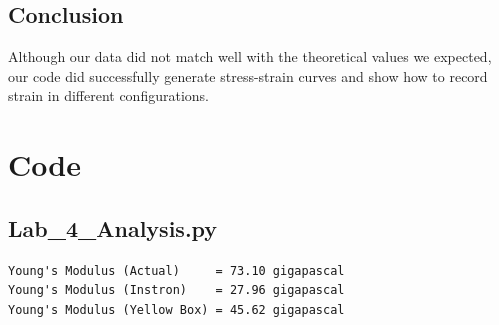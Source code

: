 \documentclass[12 pt]{report}
\begin{document}
\section{Conclusion} \label{sec:conclusion}
Although our data did not match well with the theoretical values we expected, our code did successfully generate stress-strain curves and show how to record strain in different configurations.

\printbibliography[heading=subbibintoc]
\appendix
\chapter{Code} \label{ch:code}
\section{Lab\_4\_Analysis.py} \label{sec:lab_4_analysis.py}


\begin{verbatim}
Young's Modulus (Actual)     = 73.10 gigapascal
Young's Modulus (Instron)    = 27.96 gigapascal
Young's Modulus (Yellow Box) = 45.62 gigapascal
\end{verbatim}
\end{document}
